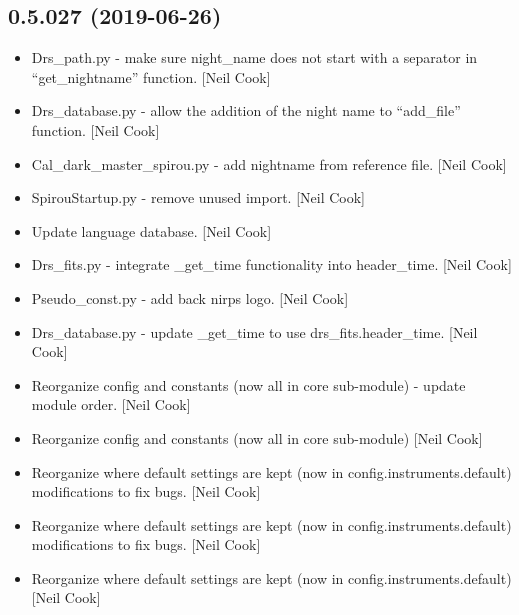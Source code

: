 \documentclass[a4paper,10pt,english]{report}
\begin{document}
\subsection{0.5.027 (2019-06-26)}
\label{\detokenize{misc/changelog:id108}}\begin{itemize}
\item {} 
Drs\_path.py - make sure night\_name does not start with a separator in
“get\_nightname” function. {[}Neil Cook{]}

\item {} 
Drs\_database.py - allow the addition of the night name to “add\_file”
function. {[}Neil Cook{]}

\item {} 
Cal\_dark\_master\_spirou.py - add nightname from reference file. {[}Neil
Cook{]}

\item {} 
SpirouStartup.py - remove unused import. {[}Neil Cook{]}

\item {} 
Update language database. {[}Neil Cook{]}

\item {} 
Drs\_fits.py - integrate \_get\_time functionality into header\_time.
{[}Neil Cook{]}

\item {} 
Pseudo\_const.py - add back nirps logo. {[}Neil Cook{]}

\item {} 
Drs\_database.py - update \_get\_time to use drs\_fits.header\_time. {[}Neil
Cook{]}

\item {} 
Reorganize config and constants (now all in core sub-module) - update
module order. {[}Neil Cook{]}

\item {} 
Reorganize config and constants (now all in core sub-module) {[}Neil
Cook{]}

\item {} 
Reorganize where default settings are kept (now in
config.instruments.default) \textendash{} modifications to fix bugs. {[}Neil Cook{]}

\item {} 
Reorganize where default settings are kept (now in
config.instruments.default) \textendash{} modifications to fix bugs. {[}Neil Cook{]}

\item {} 
Reorganize where default settings are kept (now in
config.instruments.default) {[}Neil Cook{]}


\end{itemize}
\end{document}
